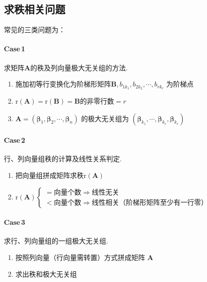 \subsection{求秩相关问题}
\begin{brown}
\begin{example}
    常见的三类问题为：

\paragraph{Case\,1}
求矩阵$\bm{A}$的秩及列向量极大无关组的方法.
\begin{enumerate}[label=\textup{(\arabic*)}]
    \item 施加初等行变换化为阶梯形矩阵$\bm{B}
    ,b_{1k_{1}},b_{2k_2},\cdots,b_{rk_{r}}$
        为阶梯点
    \item $\mathrm{r}\left(\bm{A}\right)
    =\mathrm{r}\left(\bm{B}\right)
    =\bm{B}$的非零行数$ = r$
    \item $\bm{A} = \left(\bm{\beta}_1,\bm{\beta}_2,
    \cdots,\bm{\beta}_n\right)$
        的极大无关组为
    $\left(
        \bm{\beta}_{k_1},\cdots,\bm{\beta}_{k_r}
        ,\bm{\beta}_{k_r}
    \right)$
\end{enumerate}

\paragraph{Case\,2}
行、列向量组秩的计算及线性关系判定.
\begin{enumerate}[label=\textup{(\arabic*)}]
    \item 把向量组拼成矩阵求秩$\mathrm{r}\left(\bm{A}
    \right)$
    \item $\displaystyle
    \mathrm{r}\left(\bm{A}\right)
    \begin{cases*}
    = \text{向量个数}\Longrightarrow \text{
        线性无关
    }    \\
    < \text{向量个数}\Longrightarrow 
    \text{线性相关（阶梯形矩阵至少有一行零）}
    \end{cases*}
    $
\end{enumerate}

\paragraph{Case\,3}
求行、列向量组的一组极大无关组.
\begin{enumerate}[label=\textup{(\arabic*)}]
    \item 按照列向量（行向量需转置）方式拼成矩阵
    $\bm{A}$
    \item 求出秩和极大无关组
\end{enumerate}
\end{example}
\end{brown}
